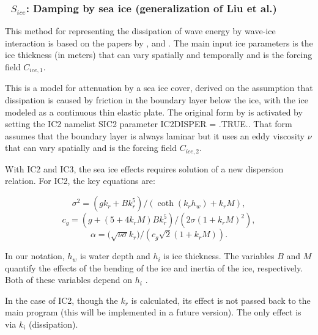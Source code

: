 \vsssub
\subsubsection{~$S_{ice}$: Damping by sea ice (generalization of Liu et al.)} \label{sec:ICE2}
\vsssub


\noindent
This method for representing the dissipation of wave energy by wave-ice interaction is based on the papers
by \cite{art:LMC88}, \cite{art:LHV91} and \cite{art:Aea15}. The main input ice parameters
is the ice thickness (in meters) that can vary spatially and temporally and is the forcing field  ${C_{ice,1}}$. 

This is a model for attenuation by a
sea ice cover, derived on the assumption that dissipation is caused by
friction in the boundary layer below the ice,
with the ice modeled as a continuous thin elastic plate. The original form by  \cite{art:LMC88} is activated by 
setting the {\code IC2} namelist {\F SIC2} parameter {\code IC2DISPER = .TRUE.}. That form 
 assumes that the boundary layer is always laminar but it uses an eddy viscosity ${\nu}$ that can vary spatially 
and is the forcing field ${C_{ice,2}}$. 

With {\code IC2} and {\code IC3}, the sea ice effects requires solution of a
new dispersion relation. For {\code IC2}, the key equations are:

\begin{equation}\label{eq:ice1}
  {\sigma}^2 = ({gk_r} + {Bk_r^5})/(\coth({k_r}{h_w}) + {k_r}{M}),
\end{equation}
\begin{equation}\label{eq:ice2}
  {c_g} = (g + (5 + 4{k_r}{M}){B}{k_r^5})/(2{\sigma}(1+{k_r}{M})^2),
\end{equation}
\begin{equation}\label{eq:ice3}
  {\alpha} = (\sqrt{{\nu\sigma}}{k_r)}/({c_g}\sqrt{2}(1+{k_r}{M})).
\end{equation}

\noindent
In our notation, $h_w$ is water depth and $h_i$ is ice thickness.  The
variables $B$ and $M$ quantify the effects of the bending of the ice and
inertia of the ice, respectively. Both of these variables depend on $h_i$ 
\citep[see][]{art:LMC88, art:LHV91}.

\vspace{\baselineskip} \noindent
In the case of {\code IC2}, though the ${k_r}$ is calculated, its effect is
not passed back to the main program (this will be implemented in a future version). The only effect is via ${k_i}$ (dissipation).

